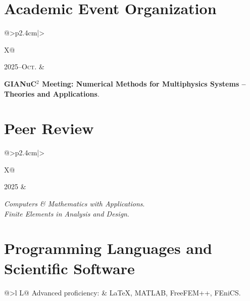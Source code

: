 \documentclass[letterpaper,12pt]{article}
\makeatletter
\newcommand{\CVEntry}[2]{%
\noindent\begin{tabularx}{\linewidth}{@{}>{\raggedleft\arraybackslash}p{2.4cm}|>{\raggedright\arraybackslash}X@{}}
\textsc{#1} & \begin{minipage}[t]{\linewidth}#2\end{minipage}
\end{tabularx}\vspace{0.45ex}}
\makeatother
\begin{document}
\section{Academic Event Organization}
\CVEntry{2025--Oct.}{%
\textbf{GIANuC$^{2}$ Meeting: Numerical Methods for Multiphysics Systems -- Theories and Applications}.}

\section{Peer Review}
\CVEntry{2025}{%
\textit{Computers \& Mathematics with Applications}.\\
\textit{Finite Elements in Analysis and Design}.}

\section{Programming Languages and Scientific Software}
\begin{tabularx}{\linewidth}{@{}>{\bfseries}l L@{}}
Advanced proficiency: & LaTeX, MATLAB, FreeFEM++, FEniCS.
\end{tabularx}
\end{document}
